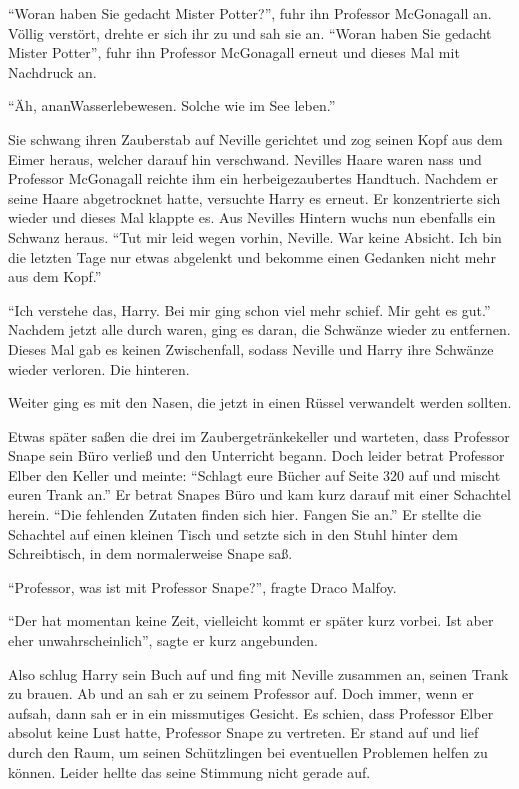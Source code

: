 \enquote{Woran haben Sie gedacht Mister Potter?}, fuhr ihn Professor McGonagall an. Völlig verstört, drehte er sich ihr zu und sah sie an. \enquote{Woran haben Sie gedacht Mister Potter}, fuhr ihn Professor McGonagall erneut und dieses Mal mit Nachdruck an.

\enquote{Äh, an\abs an\abs Wasserlebewesen. Solche wie im See leben.}

Sie schwang ihren Zauberstab auf Neville gerichtet und zog seinen Kopf aus dem Eimer heraus, welcher darauf hin verschwand. Nevilles Haare waren nass und Professor McGonagall reichte ihm ein herbeigezaubertes Handtuch. Nachdem er seine Haare abgetrocknet hatte, versuchte Harry es erneut. Er konzentrierte sich wieder und dieses Mal klappte es. Aus Nevilles Hintern wuchs nun ebenfalls ein Schwanz heraus. \enquote{Tut mir leid wegen vorhin, Neville. War keine Absicht. Ich bin die letzten Tage nur etwas abgelenkt und bekomme einen Gedanken nicht mehr aus dem Kopf.}

\enquote{Ich verstehe das, Harry. Bei mir ging schon viel mehr schief. Mir geht es gut.} Nachdem jetzt alle durch waren, ging es daran, die Schwänze wieder zu entfernen. Dieses Mal gab es keinen Zwischenfall, sodass Neville und Harry ihre Schwänze wieder verloren. Die hinteren.

Weiter ging es mit den Nasen, die jetzt in einen Rüssel verwandelt werden sollten.

Etwas später saßen die drei im Zaubergetränkekeller und warteten, dass Professor Snape sein Büro verließ und den Unterricht begann. Doch leider betrat Professor Elber den Keller und meinte: \enquote{Schlagt eure Bücher auf Seite 320 auf und mischt euren Trank an.} Er betrat Snapes Büro und kam kurz darauf mit einer Schachtel herein. \enquote{Die fehlenden Zutaten finden sich hier. Fangen Sie an.} Er stellte die Schachtel auf einen kleinen Tisch und setzte sich in den Stuhl hinter dem Schreibtisch, in dem normalerweise Snape saß.

\enquote{Professor, was ist mit Professor Snape?}, fragte Draco Malfoy.

\enquote{Der hat momentan keine Zeit, vielleicht kommt er später kurz vorbei. Ist aber eher unwahrscheinlich}, sagte er kurz angebunden.

Also schlug Harry sein Buch auf und fing mit Neville zusammen an, seinen Trank zu brauen. Ab und an sah er zu seinem Professor auf. Doch immer, wenn er aufsah, dann sah er in ein missmutiges Gesicht. Es schien, dass Professor Elber absolut keine Lust hatte, Professor Snape zu vertreten. Er stand auf und lief durch den Raum, um seinen Schützlingen bei eventuellen Problemen helfen zu können. Leider hellte das seine Stimmung nicht gerade auf.

